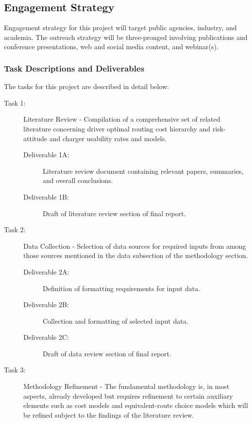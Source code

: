 \documentclass[12pt]{article}
\begin{document}
\subsection*{Engagement Strategy}

Engagement strategy for this project will target public agencies, industry, and academia. The outreach strategy will be three-pronged involving publications and conference presentations, web and social media content, and webinar(s). 

\subsubsection*{Task Descriptions and Deliverables}

The tasks for this project are described in detail below:

\begin{description}
	\item[Task 1:] Literature Review - Compilation of a comprehensive set of related literature concerning driver optimal routing cost hierarchy and risk-attitude and charger usability rates and models.
	\begin{description}
		\item[Deliverable 1A:] Literature review document containing relevant papers, summaries, and overall conclusions.
		\item[Deliverable 1B:] Draft of literature review section of final report.
	\end{description}
	\item[Task 2:] Data Collection - Selection of data sources for required inputs from among those sources mentioned in the data subsection of the methodology section.
	\begin{description}
		\item[Deliverable 2A:] Definition of formatting requirements for input data.
		\item[Deliverable 2B:] Collection and formatting of selected input data.
		\item[Deliverable 2C:] Draft of data review section of final report.
	\end{description}
	\item[Task 3:] Methodology Refinement - The fundamental methodology is, in most aspects, already developed but requires refinement to certain auxiliary elements such as cost models and equivalent-route choice models which will be refined subject to the findings of the literature review.
	\begin{description}

\end{description}
\end{description}
\end{document}
